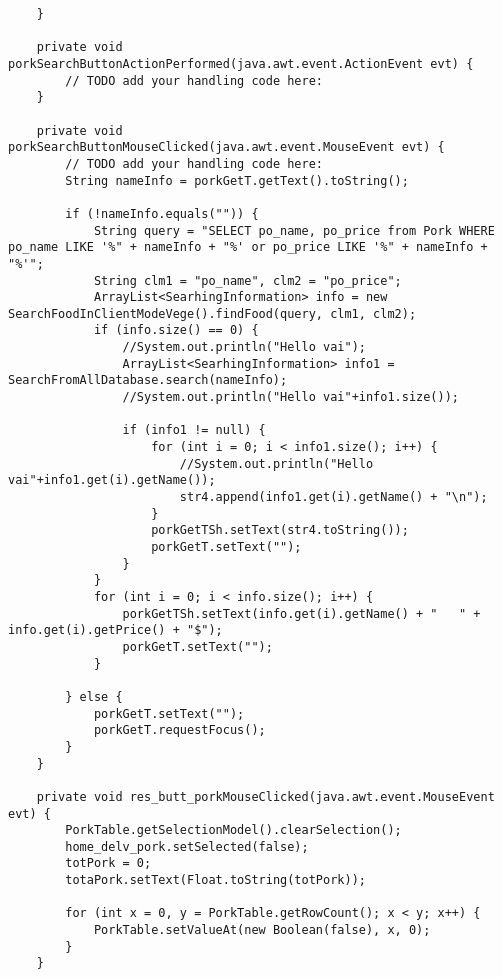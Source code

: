 \documentclass[12pt,a4paper]{article}
\begin{document}
\begin{lstlisting}
    }                                           

    private void porkSearchButtonActionPerformed(java.awt.event.ActionEvent evt) {                                                 
        // TODO add your handling code here:
    }                                                

    private void porkSearchButtonMouseClicked(java.awt.event.MouseEvent evt) {                                              
        // TODO add your handling code here:
        String nameInfo = porkGetT.getText().toString();

        if (!nameInfo.equals("")) {
            String query = "SELECT po_name, po_price from Pork WHERE po_name LIKE '%" + nameInfo + "%' or po_price LIKE '%" + nameInfo + "%'";
            String clm1 = "po_name", clm2 = "po_price";
            ArrayList<SearhingInformation> info = new SearchFoodInClientModeVege().findFood(query, clm1, clm2);
            if (info.size() == 0) {
                //System.out.println("Hello vai");
                ArrayList<SearhingInformation> info1 = SearchFromAllDatabase.search(nameInfo);
                //System.out.println("Hello vai"+info1.size());

                if (info1 != null) {
                    for (int i = 0; i < info1.size(); i++) {
                        //System.out.println("Hello vai"+info1.get(i).getName());
                        str4.append(info1.get(i).getName() + "\n");
                    }
                    porkGetTSh.setText(str4.toString());
                    porkGetT.setText("");
                }
            }
            for (int i = 0; i < info.size(); i++) {
                porkGetTSh.setText(info.get(i).getName() + "   " + info.get(i).getPrice() + "$");
                porkGetT.setText("");
            }

        } else {
            porkGetT.setText("");
            porkGetT.requestFocus();
        }
    }                                             

    private void res_butt_porkMouseClicked(java.awt.event.MouseEvent evt) {                                           
        PorkTable.getSelectionModel().clearSelection();
        home_delv_pork.setSelected(false);
        totPork = 0;
        totaPork.setText(Float.toString(totPork));

        for (int x = 0, y = PorkTable.getRowCount(); x < y; x++) {
            PorkTable.setValueAt(new Boolean(false), x, 0);
        }
    }                                          


\end{lstlisting}
\end{document}
